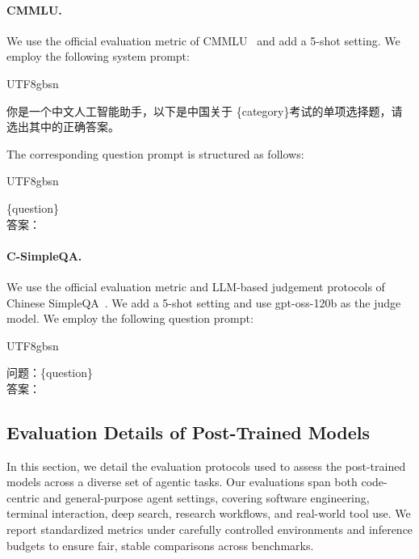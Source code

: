 \paragraph{CMMLU.} We use the official evaluation metric of CMMLU~\cite{li2023cmmlu} and add a 5-shot setting. We employ the following system prompt:

\begin{CJK*}{UTF8}{gbsn}
\begin{MyBox}{}

    \raggedright
    你是一个中文人工智能助手，以下是中国关于 \{category\}考试的单项选择题，请选出其中的正确答案。
\end{MyBox}
\end{CJK*}

The corresponding question prompt is structured as follows:

\begin{CJK*}{UTF8}{gbsn}
\begin{MyBox}{}

    \{question\} \\
    答案：
\end{MyBox}
\end{CJK*}

\paragraph{C-SimpleQA.}  We use the official evaluation metric and LLM-based judgement protocols of Chinese SimpleQA~\cite{he2024chinesesimpleqa}. We add a 5-shot setting and use gpt-oss-120b\cite{openai2025gptoss120bgptoss20bmodel} as the judge model. We employ the following question prompt:

\begin{CJK*}{UTF8}{gbsn}
\begin{MyBox}{}

    问题：\{question\} \\
    答案：
\end{MyBox}
\end{CJK*}


\subsection{Evaluation Details of Post-Trained Models}
In this section, we detail the evaluation protocols used to assess the post-trained models across a diverse set of agentic tasks.
Our evaluations span both code-centric and general-purpose agent settings, covering software engineering, terminal interaction, deep search, research workflows, and real-world tool use.
We report standardized metrics under carefully controlled environments and inference budgets to ensure fair, stable comparisons across benchmarks.

